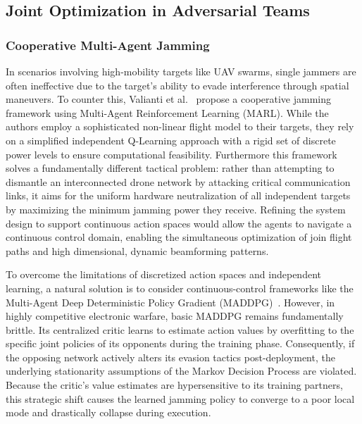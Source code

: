 \documentclass[conference]{IEEEtran}
\newcommand{\adm}[1]{{\color{orange}{[#1]}}}
\begin{document}
\subsection{Joint Optimization in Adversarial Teams}

\subsubsection{Cooperative Multi-Agent Jamming}
In scenarios involving high-mobility targets like UAV swarms, single jammers are often ineffective due to the target's ability to evade interference through spatial maneuvers. 
To counter this, Valianti et al.~\cite{valianti2024cooperative} propose a cooperative jamming framework using Multi-Agent Reinforcement Learning (MARL). 
While the authors employ a sophisticated non-linear flight model to their targets, they rely on a simplified independent Q-Learning approach with a rigid set of discrete power levels to ensure computational feasibility.
Furthermore this framework solves a fundamentally different tactical problem: rather than attempting to dismantle an interconnected drone network by attacking critical communication links, it aims for the uniform hardware neutralization of all independent targets by maximizing the minimum jamming power they receive.
Refining the system design to support continuous action spaces would allow the agents to navigate a continuous control domain, enabling the simultaneous optimization of join flight paths and high dimensional, dynamic beamforming patterns.

To overcome the limitations of discretized action spaces and independent learning, a natural solution is to consider continuous-control frameworks like the Multi-Agent Deep Deterministic Policy Gradient (MADDPG)~\cite{NIPS2017_68a97503}.
However, in highly competitive electronic warfare, basic MADDPG remains fundamentally brittle.
Its centralized critic learns to estimate action values by overfitting to the specific joint policies of its opponents during the training phase. 
Consequently, if the opposing network actively alters its evasion tactics post-deployment, the underlying stationarity assumptions of the Markov Decision Process are violated. 
Because the critic's value estimates are hypersensitive to its training partners, this strategic shift causes the learned jamming policy to converge to a poor local mode and drastically collapse during execution.
\end{document}
